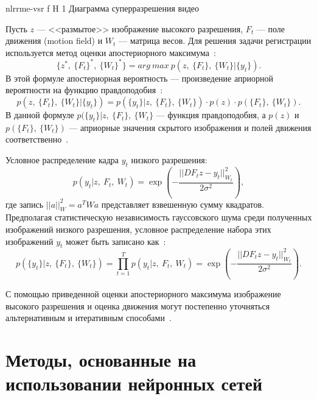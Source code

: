 \documentclass{bmstu}
\begin{document}
    {nlrrme-vsr}
    {f}
    {H}
    {1\textwidth}
    {Диаграмма суперразрешения видео~\cite{Jian2014}}

Пусть $z$ --- <<размытое>> изображение высокого разрешения, $F_t$ --- поле движения (motion field) и $W_t$ --- матрица весов. 
Для решения задачи регистрации используется метод оценки апостериорного максимума~\cite{Jian2014}:
\begin{equation}
\{z^{*},~\{F_t\}^{*},~\{W_t\}^{*}\} = arg~max~p(z,~\{F_t\},~\{W_t\}|\{y_t\}).
\end{equation}
В этой формуле апостериорная вероятность --- произведение априорной вероятности на функцию правдоподобия~\cite{Jian2014}:
\begin{equation}
p(z,~\{F_t\},~\{W_t\}|\{y_t\}) = p(\{y_t\}|z,~\{F_t\},~\{W_t\}) \cdot p(z) \cdot p(\{F_t\},~\{W_t\}).
\end{equation}
В данной формуле $p(\{y_t\}|z,~\{F_t\},~\{W_t\}$ --- функция правдоподобия, а $p(z)$ и $p(\{F_t\},~\{W_t\})$ --- априорные значения скрытого изображения и полей движения соответственно~\cite{Jian2014}.

Условное распределение кадра $y_t$ низкого разрешения:
\begin{equation}
p(y_t|z,~F_t,~W_t) = \exp(-\frac{||DF_{t}z - y_t||_{W_t}^{2}}{2 \sigma^2}),
\end{equation}
где запись $||a||_{W}^2 = a^{T}Wa$ представляет взвешенную сумму квадратов. 
Предполагая статистическую независимость гауссовского шума среди полученных изображений низкого разрешения, условное распределение набора этих изображений $y_t$ может быть записано как~\cite{Jian2014}:
\begin{equation}
p(\{y_t\}|z,~\{F_t\},~\{W_t\}) = \prod_{t = 1}^{T} p(y_t|z,~F_t,~W_t) = \exp(-\frac{||DF_{t}z - y_t||_{W_t}^{2}}{2 \sigma^2}).
\end{equation}

С помощью приведенной оценки апостериорного максимума изображение высокого разрешения и оценка движения могут постепенно уточняться альтернативным и итеративным способами~\cite{Jian2014}.

\section{Методы, основанные на использовании нейронных сетей}
\end{document}
